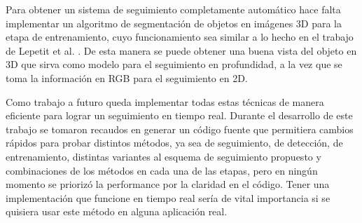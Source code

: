 Para obtener un sistema de seguimiento completamente automático hace falta implementar un algoritmo de segmentación de objetos en imágenes 3D para la etapa de entrenamiento, cuyo funcionamiento sea similar a lo hecho en el trabajo de Lepetit et al. \cite{park2011texture}. De esta manera se puede obtener una buena vista del objeto en 3D que sirva como modelo para el seguimiento en profundidad, a la vez que se toma la información en RGB para el seguimiento en 2D.

Como trabajo a futuro queda implementar todas estas técnicas de manera eficiente para lograr un seguimiento en tiempo real. Durante el desarrollo de este trabajo se tomaron recaudos en generar un código fuente que permitiera cambios rápidos para probar distintos métodos, ya sea de seguimiento, de detección, de entrenamiento, distintas variantes al esquema de seguimiento propuesto y combinaciones de los métodos en cada una de las etapas, pero en ningún momento se priorizó la performance por la claridad en el código. Tener una implementación que funcione en tiempo real sería de vital importancia si se quisiera usar este método en alguna aplicación real.
